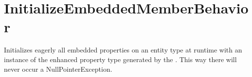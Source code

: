 \section{InitializeEmbeddedMemberBehavior}
\label{feature:InitializeEmbeddedMemberBehavior}
\ClearAPI
Initializes eagerly all embedded properties on an entity type at runtime with an instance of the enhanced property type generated by the . This way there will never occur a NullPointerException.
\TODO